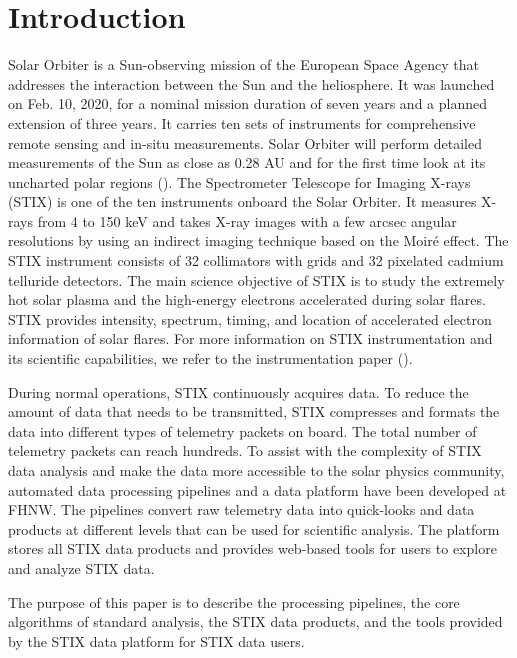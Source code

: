 \documentclass[referee]{aa} %
\begin{document}
\section{Introduction}
Solar Orbiter is a Sun-observing mission of the European Space Agency that 
addresses the interaction between the Sun and the heliosphere.
It was launched on Feb. 10, 2020, for a nominal mission duration of seven years and a planned 
extension of three years. It carries ten sets of instruments for comprehensive
remote sensing and in-situ measurements. 
Solar Orbiter will perform detailed measurements of the Sun as close as 0.28 AU and for the first time look at its uncharted polar regions (\cite{SolarOrbiter2020}).  
The Spectrometer Telescope for Imaging X-rays (STIX) is one of the ten instruments onboard the Solar Orbiter.  
It measures X-rays from 4 to 150 keV and takes X-ray images with a few arcsec angular resolutions by using an indirect imaging technique based on the Moiré effect.  The STIX instrument consists of 32 collimators with grids and 32 pixelated cadmium telluride detectors.  The main science objective of STIX is to study the extremely hot solar plasma and the high-energy electrons accelerated during solar flares. STIX provides intensity,  spectrum, timing, and location of accelerated electron information of solar flares. For more information on STIX instrumentation and its scientific capabilities, we refer to the instrumentation paper (\cite{StixInstrument}).


During normal operations, STIX continuously acquires data. To reduce the amount of data that needs to be transmitted, STIX compresses and formats the data into different types of telemetry packets on board. 
The total number of telemetry packets can reach hundreds. To assist with the complexity of STIX data analysis and make the data more accessible to the solar physics community, automated data processing pipelines and a data platform have been developed at FHNW. The pipelines convert raw telemetry data into quick-looks and data products at different levels that can be used for scientific analysis. The platform stores all STIX data products and provides web-based tools for users to explore and analyze STIX data.

 The purpose of this paper is to describe the processing pipelines,
 the core algorithms of standard analysis, the STIX data products, and the tools provided by the 
 STIX data platform for STIX data users.
\end{document}
